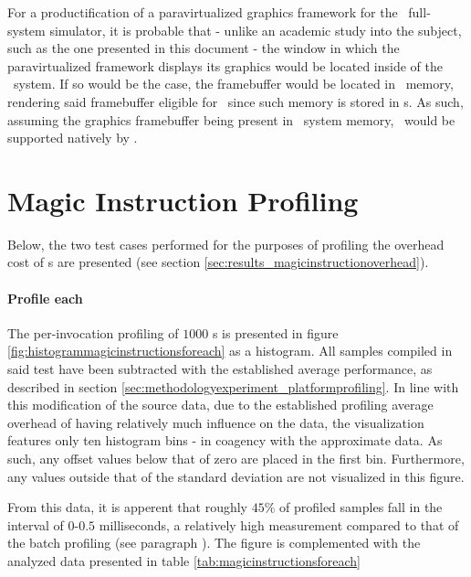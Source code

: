 For a productification of a paravirtualized graphics framework for the \dvttermsimics\ full-system simulator, it is probable that - unlike an academic study into the subject, such as the one presented in this document - the window in which the paravirtualized framework displays its graphics would be located inside of the \dvttermtarget\ system.
If so would be the case, the framebuffer would be located in \dvttermtarget\ memory, rendering said framebuffer eligible for \dvttermreverseexecution\ since such memory is stored in \dvttermcheckpoint s.
As such, assuming the graphics framebuffer being present in \dvttermtarget\ system memory, \dvttermreverseexecution\ would be supported natively by \dvttermsimics .

\section{Magic Instruction Profiling}
\label{sec:appendixa_magicinstructionprofiling}
Below, the two test cases performed for the purposes of profiling the overhead cost of \dvttermmagicinstruction s are presented (see section \ref{sec:results_magicinstructionoverhead}).

\paragraph{Profile each}
\label{par:results_magicinstructionoverhead_profileeach}
The per-invocation profiling of $1000$ \dvttermmagicinstruction s is presented in figure \ref{fig:histogrammagicinstructionsforeach} as a histogram.
All samples compiled in said test have been subtracted with the established average performance, as described in section \ref{sec:methodologyexperiment_platformprofiling}.
In line with this modification of the source data, due to the established profiling average overhead of  having relatively much influence on the data, the visualization features only ten histogram bins - in coagency with the approximate data.
As such, any offset values below that of zero are placed in the first bin.
Furthermore, any values outside that of the standard deviation are not visualized in this figure.



From this data, it is apperent that roughly $45\%$ of profiled samples fall in the interval of $0$-$0.5$ milliseconds, a relatively high measurement compared to that of the batch profiling (see paragraph ).
The figure is complemented with the analyzed data presented in table \ref{tab:magicinstructionsforeach}

